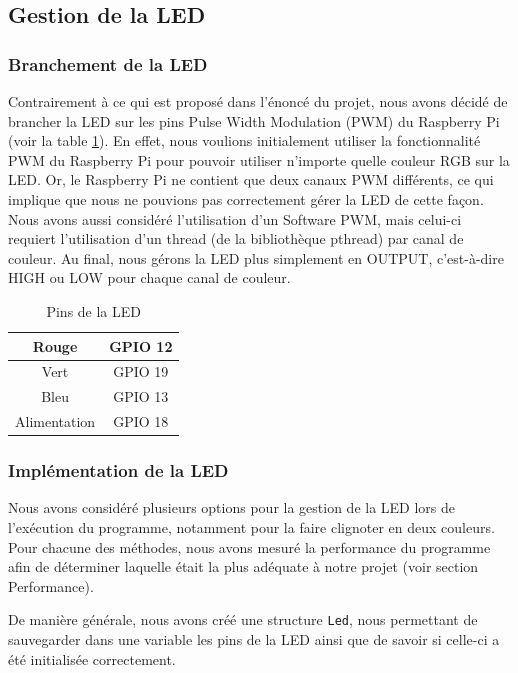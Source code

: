 \documentclass[a4paper,11pt]{article}
\begin{document}
\subsection{Gestion de la LED}

\subsubsection{Branchement de la LED}

Contrairement à ce qui est proposé dans l'énoncé du projet, nous avons décidé de brancher la LED sur les pins Pulse Width Modulation (PWM) du Raspberry Pi (voir la table \ref{table:branchement}). En effet, nous voulions initialement utiliser la fonctionnalité PWM du Raspberry Pi pour pouvoir utiliser n'importe quelle couleur RGB sur la LED. Or, le Raspberry Pi ne contient que deux canaux PWM différents, ce qui implique que nous ne pouvions pas correctement gérer la LED de cette façon. Nous avons aussi considéré l'utilisation d'un Software PWM, mais celui-ci requiert l'utilisation d'un thread (de la bibliothèque pthread) par canal de couleur. Au final, nous gérons la LED plus simplement en OUTPUT, c'est-à-dire HIGH ou LOW pour chaque canal de couleur.

\begin{table}[h]
\centering 
\begin{tabular}{|c|c|} \hline Rouge & GPIO 12 \\ \hline Vert & GPIO 19 \\  \hline Bleu & GPIO 13 \\ \hline Alimentation & GPIO 18 \\ \hline \end{tabular} \caption{Pins de la LED} \label{table:branchement}
\end{table}

\subsubsection{Implémentation de la LED}

Nous avons considéré plusieurs options pour la gestion de la LED lors de l'exécution du programme, notamment pour la faire clignoter en deux couleurs. Pour chacune des méthodes, nous avons mesuré la performance du programme afin de déterminer laquelle était la plus adéquate à notre projet (voir section Performance).

De manière générale, nous avons créé une structure \texttt{Led}, nous permettant de sauvegarder dans une variable les pins de la LED ainsi que de savoir si celle-ci a été initialisée correctement.
\end{document}
